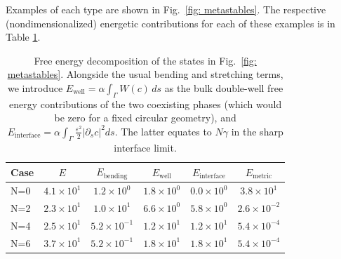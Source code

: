 \documentclass[
aip,
jcp,
reprint, 
floatfix
]{revtex4-1}
\begin{document}
Examples of each type are shown in Fig.~\ref{fig: metastables}. The respective (nondimensionalized) energetic contributions for each of these examples is in Table \ref{table:metastables}.
\begin{table}[hbp]
  \centering
  \begin{tabular}{lccccc}
    \hline
    Case & $E$ & $E_{\text{bending}}$& $E_{\text{well}}$ & $E_{\text{interface}}$& $E_{\text{metric}}$\\
    \hline
    N=0 & $4.1\times10^{1}$ & $1.2\times10^{0}$ & $1.8\times10^{0}$ & $0.0\times10^{0}$ & $3.8\times10^{1}$ \\
    N=2 & $2.3\times10^{1}$ & $1.0\times10^{1}$ & $6.6\times10^{0}$ & $5.8\times10^{0}$ & $2.6\times10^{-2}$ \\
    N=4 & $2.5\times10^{1}$ & $5.2\times10^{-1}$ & $1.2\times10^{1}$ & $1.2\times10^{1}$ & $5.4\times10^{-4}$ \\
    N=6 & $3.7\times10^{1}$ & $5.2\times10^{-1}$ & $1.8\times10^{1}$ & $1.8\times10^{1}$ & $5.4\times10^{-4}$ \\
    \hline
  \end{tabular}
  \caption{Free energy decomposition of the states in Fig.~\ref{fig: metastables}. Alongside the usual bending and stretching terms, we introduce $E_\text{well} = \alpha \int_{\Gamma} W(c) \, ds$ as the bulk double-well free energy contributions of the two coexisting phases (which would be zero for a fixed circular geometry), and $E_\text{interface} = \alpha \int_{\Gamma}\frac{\varepsilon^2}{2}\left|\partial_s c\right|^2 ds$. The latter equates to $N\gamma$ in the sharp interface limit. }
  \label{table:metastables}
\end{table}
\end{document}
